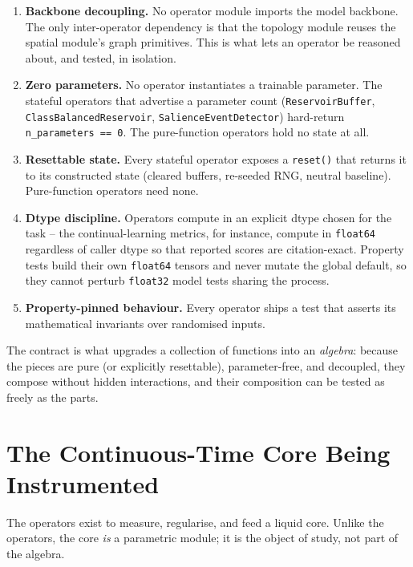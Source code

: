 \documentclass[11pt]{article}
\theoremstyle{definition}
\newcommand{\code}[1]{\texttt{#1}}
\begin{document}
\begin{enumerate}[leftmargin=1.4em]
\item \textbf{Backbone decoupling.} No operator module imports the model
backbone. The only inter-operator dependency is that the topology module
reuses the spatial module's graph primitives. This is what lets an operator
be reasoned about, and tested, in isolation.
\item \textbf{Zero parameters.} No operator instantiates a trainable
parameter. The stateful operators that advertise a parameter count
(\code{ReservoirBuffer}, \code{ClassBalancedReservoir},
\code{SalienceEventDetector}) hard-return \code{n\_parameters == 0}. The
pure-function operators hold no state at all.
\item \textbf{Resettable state.} Every stateful operator exposes a
\code{reset()} that returns it to its constructed state (cleared buffers,
re-seeded RNG, neutral baseline). Pure-function operators need none.
\item \textbf{Dtype discipline.} Operators compute in an explicit dtype
chosen for the task -- the continual-learning metrics, for instance, compute
in \code{float64} regardless of caller dtype so that reported scores are
citation-exact. Property tests build their own \code{float64} tensors and
never mutate the global default, so they cannot perturb \code{float32} model
tests sharing the process.
\item \textbf{Property-pinned behaviour.} Every operator ships a test that
asserts its mathematical invariants over randomised inputs.
\end{enumerate}

The contract is what upgrades a collection of functions into an
\emph{algebra}: because the pieces are pure (or explicitly resettable),
parameter-free, and decoupled, they compose without hidden interactions, and
their composition can be tested as freely as the parts.

\section{The Continuous-Time Core Being Instrumented}\label{sec:ltc}
The operators exist to measure, regularise, and feed a liquid core. Unlike
the operators, the core \emph{is} a parametric module; it is the object of
study, not part of the algebra.
\end{document}
